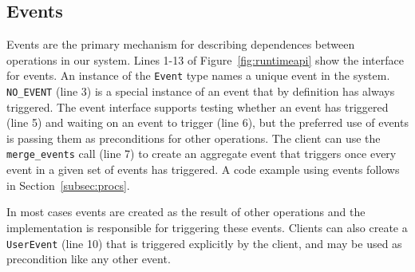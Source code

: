 \subsection{Events}
\label{subsec:events}
Events are the primary mechanism for describing dependences between operations in our system.
Lines 1-13 of Figure~\ref{fig:runtimeapi} show the interface for events.  An instance of the {\tt Event} type 
names a unique event in the system.  {\tt NO\_EVENT} (line 3)
is a special instance
of an event that by definition has always triggered.  The event interface
supports testing whether an event has triggered (line 5) and waiting on
an event to trigger (line 6), but the preferred
use of events is passing them as preconditions for other operations.  The client can use the
{\tt merge\_events} call (line 7) to create an aggregate event that triggers once every
event in a given set of events has triggered.  A code example using events follows in
Section~\ref{subsec:procs}.

In most cases events are created as the result of other
operations and the implementation is responsible for triggering these events.  Clients
can also create a {\tt UserEvent} (line 10) that is triggered explicitly by the client,
and may be used as precondition like any other event.



